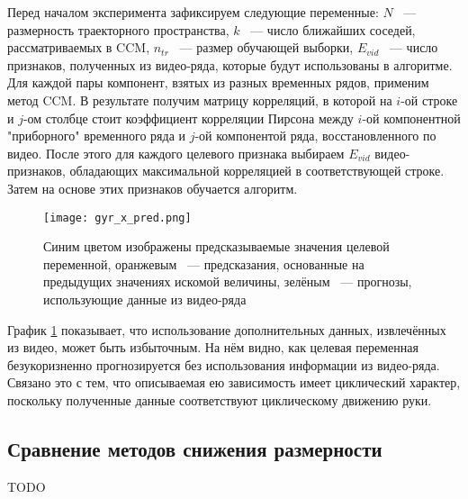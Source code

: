 \documentclass[a4paper, 12pt]{article}
\begin{document}
Перед началом эксперимента зафиксируем следующие переменные: $N$ ~--- размерность траекторного пространства, $k$ ~--- число ближайших соседей, рассматриваемых в CCM, $n_{tr}$ ~--- размер обучающей выборки, $E_{vid}$ ~--- число признаков, полученных из видео-ряда, которые будут использованы в алгоритме.
Для каждой пары компонент, взятых из разных временных рядов, применим метод CCM.
В результате получим матрицу корреляций, в которой на $i\text{-ой}$ строке и $j\text{-ом}$ столбце стоит коэффициент корреляции Пирсона между $i\text{-ой}$ компонентной "приборного" временного ряда и $j\text{-ой}$ компонентой ряда, восстановленного по видео. 
После этого для каждого целевого признака выбираем $E_{vid}$ видео-признаков, обладающих максимальной корреляцией в соответствующей строке.
Затем на основе этих признаков обучается алгоритм.

\begin{figure}[bhtp]
	\texttt{[image: gyr\_x\_pred.png]}
	\caption{Синим цветом изображены предсказываемые значения целевой переменной, оранжевым ~--- предсказания, основанные на предыдущих значениях искомой величины, зелёным ~--- прогнозы, использующие данные из видео-ряда}
	\label{fig:1}
\end{figure}

График \ref{fig:1} показывает, что использование дополнительных данных, извлечённых из видео, может быть избыточным. 
На нём видно, как целевая переменная безукоризненно прогнозируется без использования информации из видео-ряда. 
Связано это с тем, что описываемая ею зависимость имеет циклический характер, поскольку полученные данные соответствуют циклическому движению руки.

\subsection{Сравнение методов снижения размерности}
TODO




\end{document}
